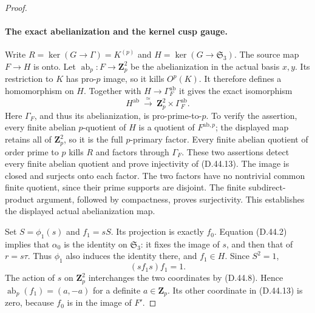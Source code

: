 \begin{proof}
\paragraph{The exact abelianization and the kernel cusp gauge.}
Write \(R=\ker(G\to\Gamma)=K^{(p)}\)
and \(H=\ker(G\to\mathfrak S_3)\).
The source map \(F\to H\) is onto.
Let
\(\operatorname{ab}_p:F\to\mathbf Z_p^2\)
be the abelianization in the actual
basis \(x,y\).
Its restriction to \(K\) has pro-\(p\)
image, so it kills \(O^p(K)\).
It therefore defines a homomorphism
on \(H\).
Together with \(H\to\Gamma_F^{\mathrm{ab}}\)
it gives the exact isomorphism
\[
 H^{\mathrm{ab}}\ \xrightarrow{\ \simeq\ }\
       \mathbf Z_p^2\times\Gamma_F^{\mathrm{ab}}.
 \tag{D.44.13}
\]
Here \(\Gamma_F\), and thus its
abelianization, is pro-prime-to-\(p\).
To verify the assertion, every finite
abelian \(p\)-quotient of \(H\) is a
quotient of \(F^{\mathrm{ab},p}\);
the displayed map retains all of
\(\mathbf Z_p^2\), so it is the full
\(p\)-primary factor.
Every finite abelian quotient of
order prime to \(p\) kills \(R\)
and factors through \(\Gamma_F\).
These two assertions detect every
finite abelian quotient and prove
injectivity of \textup{(D.44.13)}.
The image is closed and surjects
onto each factor.
The two factors have no nontrivial
common finite quotient, since
their prime supports are disjoint.
The finite subdirect-product argument,
followed by compactness, proves
surjectivity.
This establishes the displayed
actual abelianization map.

Set \(S=\phi_1(s)\) and \(f_1=sS\).
Its projection is exactly \(f_0\).
Equation \textup{(D.44.2)} implies
that \(\alpha_0\) is the identity
on \(\mathfrak S_3\):
it fixes the image of \(s\), and
then that of \(r=s\tau\).
Thus \(\phi_1\) also induces the
identity there, and \(f_1\in H\).
Since \(S^2=1\),
\[
                       (s f_1s)f_1=1.
 \tag{D.44.14}
\]
The action of \(s\) on
\(\mathbf Z_p^2\) interchanges
the two coordinates by
\textup{(D.44.8)}.
Hence
\(\operatorname{ab}_p(f_1)=(a,-a)\)
for a definite \(a\in\mathbf Z_p\).
Its other coordinate in
\textup{(D.44.13)} is zero,
because \(f_0\) is in the image
of \(F'\).


\end{proof}

